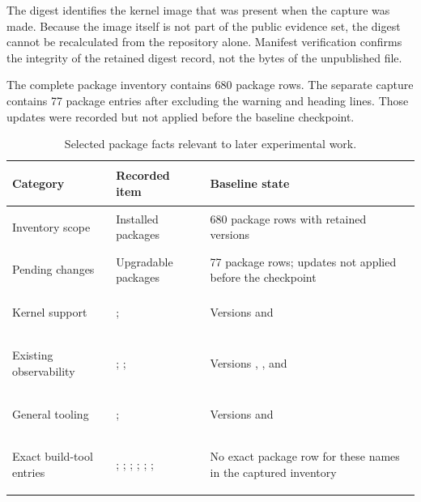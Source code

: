 The digest identifies the kernel image that was present when the capture was
made. Because the image itself is not part of the public evidence set, the
digest cannot be recalculated from the repository alone. Manifest verification
confirms the integrity of the retained digest record, not the bytes of the
unpublished  file.

The complete package inventory contains 680 package rows. The separate
 capture contains 77 package entries after excluding the
 warning and heading lines. Those updates were recorded but not
applied before the baseline checkpoint.

\begin{table}[H]
    \centering
    \caption{Selected package facts relevant to later experimental work.}
    \label{tab:baseline-package-state}
    \small
    \begin{tabularx}{\textwidth}{@{}>{\bfseries\raggedright\arraybackslash}p{}>{\raggedright\arraybackslash}p{}Y@{}}
        \toprule
        Category & Recorded item & Baseline state \\
        \midrule
        Inventory scope &
        Installed packages &
        680 package rows with retained versions \\

        Pending changes &
        Upgradable packages &
        77 package rows; updates not applied before the checkpoint \\

        Kernel support &
        ;  &
        Versions  and
         \\

        Existing observability &
        ; ;  &
        Versions ,
        , and  \\

        General tooling &
        ;  &
        Versions  and
         \\

        Exact build-tool entries &
        ; ; ; ;
        ; ;  &
        No exact package row for these names in the captured inventory \\
        \bottomrule
    \end{tabularx}
\end{table}

